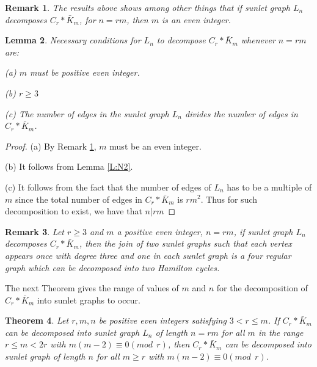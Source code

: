 \documentclass[12pt]{report}
\newtheorem{thm}{Theorem}[section]
\newtheorem{lem}[thm]{Lemma}
\newtheorem{rem}[thm]{Remark}
\begin{document}
\begin{rem}\label{R:N1}
{\rm The results above shows among other things that if sunlet graph $L_{n}$ decomposes $C_{r}*\bar{K}_{m}$, for
$n=rm$, then $m$ is an even integer}.
\end{rem}
\begin{lem}\label{L:N4}
Necessary conditions for $L_{n}$ to decompose $C_{r}*\bar{K}_{m}$ whenever $%
n=rm$ are:

(a) $m$ must be positive even integer.

(b) $r\geq 3$

(c) The number of edges in the sunlet graph $L_n$ divides the number of edges in $C_{r}*\bar{K}%
_{m}$.
\end{lem}
\begin{proof}
(a) By Remark \ref{R:N1}, $m$ must be an even integer.

(b) It follows from Lemma \ref{L:N2}.

(c) It follows from the fact that the number of edges  of $L_{n}$
has to be a multiple of $m$ since the total number of edges in
$C_{r}*\bar{K}_{m}$ is $rm^{2}$. Thus for such decomposition to
exist, we have that $n|rm$
\end{proof}
\begin{rem}\label{R:N5}
{\rm Let $r\geq 3$ and $m$ a positive even integer, $n=rm$, if
sunlet graph $L_n$ decomposes $C_{r}*\bar{K}_{m}$, then the join of
two sunlet graphs such that each vertex appears once with degree
three and one in each sunlet graph is a four regular graph which can
be decomposed into two Hamilton cycles.}
\end{rem}
The next Theorem gives the range of values of $m$ and $n$ for the decomposition of $C_{r}*\bar{K}_{m}$ into sunlet graphs to occur.
\begin{thm}\label{T:N6}
Let $r,m,n$ be positive even integers satisfying $3<r\leq m$.  If $C_{r}*\bar{K%
}_{m}$ can be decomposed into sunlet graph $L_{n}$ of length $n=rm$
for all $m$ in the range $r\leq m<2r$ with $m\left( m-2\right)
\equiv 0\left( mod\ \ r\right) $, then $C_{r}*\bar{K}_{m}$ can be
decomposed into sunlet graph of length $n$ for all $m\geq r$ with
$m\left( m-2\right) \equiv 0\left( {mod}\ \ r\right) $.
\end{thm}
\end{document}
